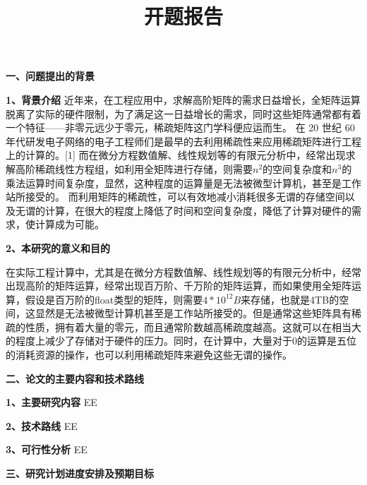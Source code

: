 \documentclass{article}
\begin{document}
  

\title{开题报告}
\date{}

\maketitle


\textbf{一、问题提出的背景}
      \qquad
\newline
    
     \textbf{1、背景介绍}
     \qquad
      近年来，在工程应用中，求解高阶矩阵的需求日益增长，全矩阵运算脱离了实际的硬件限制，为了满足这一日益增长的需求，同时这些矩阵通常都有着一个特征——非零元远少于零元，稀疏矩阵这门学科便应运而生。
在 20 世纪 60 年代研发电子网络的电子工程师们是最早的去利用稀疏性来应用稀疏矩阵进行工程上的计算的。[1]
而在微分方程数值解、线性规划等的有限元分析中，经常出现求解高阶稀疏线性方程组，如利用全矩阵进行存储，则需要$n^2$的空间复杂度和$n^3$的乘法运算时间复杂度，显然，这种程度的运算量是无法被微型计算机，甚至是工作站所接受的。
而利用矩阵的稀疏性，可以有效地减小消耗很多无谓的存储空间以及无谓的计算，在很大的程度上降低了时间和空间复杂度，降低了计算对硬件的需求，使计算成为可能。
\newline

 \textbf{2、本研究的意义和目的}
 
 在实际工程计算中，尤其是在微分方程数值解、线性规划等的有限元分析中，经常出现高阶的矩阵运算，经常出现百万阶、千万阶的矩阵运算，而如果使用全矩阵运算，假设是百万阶的float类型的矩阵，则需要$4*10^{12}B$来存储，也就是4TB的空间，这显然是无法被微型计算机甚至是工作站所接受的。但是通常这些矩阵具有稀疏的性质，拥有着大量的零元，而且通常阶数越高稀疏度越高。这就可以在相当大的程度上减少了存储对于硬件的压力。同时，在计算中，大量对于0的运算是五位的消耗资源的操作，也可以利用稀疏矩阵来避免这些无谓的操作。\newline
 
 \qquad
\newline

\textbf{二、论文的主要内容和技术路线}
      \qquad
\newline

     \textbf{1、主要研究内容}
     EE
\newline


     \textbf{2、技术路线}
     EE
\newline


     \textbf{3、可行性分析}
     EE
\newline

\textbf{三、研究计划进度安排及预期目标}
      \qquad
\newline
 
\end{document}
